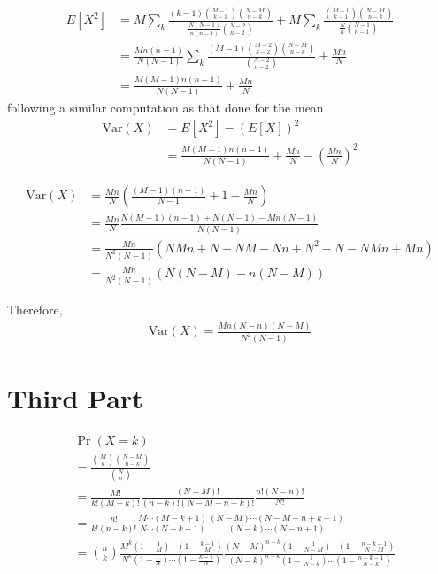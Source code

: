 \documentclass{beamer}
\providecommand{\pr}[1]{\ensuremath{\Pr\left(#1\right)}}
\providecommand{\brak}[1]{\ensuremath{\left(#1\right)}}
\begin{document}
	\begin{frame}
	\begin{align}
		E[X^2] &= M \sum_k \frac{(k-1) \binom{M-1}{k-1} \binom{N-M}{n-k}}{\frac{N(N-1)}{n(n-1)}\binom{N-2}{n-2}} + M \sum_k \frac{\binom{M-1}{k-1} \binom{N-M}{n-k}}{\frac{N}{n} \binom{N-1}{n-1}} \\ 
		&= \frac{Mn(n-1)}{N(N-1)} \sum_k \frac{(M-1) \binom{M-2}{k-2} \binom{N-M}{n-k}}{\binom{N-2}{n-2}} + \frac{Mn}{N} \\
		&= \frac{M(M-1)n(n-1)}{N(N-1)} + \frac{Mn}{N}
	\end{align}
	following a similar computation as that done for the mean
	\begin{align}
		\mathrm{Var}(X) &= E[X^2] - \brak{E[X]}^2 \\
		&= \frac{M(M-1)n(n-1)}{N(N-1)} + \frac{Mn}{N} - \brak{\frac{Mn}{N}}^2
	\end{align}
	\end{frame}
		
	\begin{frame}
	\begin{align}
		\mathrm{Var}(X) &= \frac{Mn}{N} \brak{\frac{(M-1)(n-1)}{N-1} + 1 - \frac{Mn}{N}} \\
		&= \frac{Mn}{N} \frac{N(M-1)(n-1) + N(N-1) - Mn(N-1)}{N(N-1)} \\
		&= \frac{Mn}{N^2(N-1)} \brak{NMn + N - NM - Nn + N^2 - N - NMn + Mn} \\
		&= \frac{Mn}{N^2(N-1)} (N(N-M) - n(N-M))
	\end{align}
	\begin{block}{}
	Therefore,
		\begin{align}
			\mathrm{Var}(X) = \frac{Mn(N-n)(N-M)}{N^2(N-1)}
		\end{align}
	\end{block}
	\end{frame}
	
	\section{Third Part}
	\begin{frame}
	\begin{align}
		&\pr{X=k} \\
		&= \frac{\binom{M}{k} \binom{N-M}{n-k}}{\binom{N}{n}} \\
		&= \frac{M!}{k!(M-k)!} \frac{(N-M)!}{(n-k)!(N-M-n+k)!} \frac{n!(N-n)!}{N!} \\
		&= \frac{n!}{k!(n-k)!} \frac{M\cdots(M-k+1)}{N\cdots(N-k+1)} \frac{(N-M)\cdots(N-M-n+k+1)}{(N-k)\cdots(N-n+1)} \\
		&= \binom{n}{k} \frac{M^k \brak{1-\frac1M} \cdots \brak{1-\frac{k-1}{M}}}{N^k \brak{1-\frac1N} \cdots \brak{1-\frac{k-1}{N}}} \frac{(N-M)^{n-k} \brak{1-\frac{1}{N-M}} \cdots \brak{1-\frac{n-k-1}{N-M}}}{(N-k)^{n-k} \brak{1-\frac{1}{N-k}} \cdots \brak{1-\frac{n-k-1}{N-k}}}
	\end{align}
	\end{frame}
	
\end{document}
